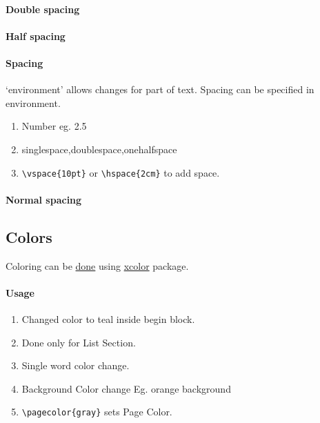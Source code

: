 \documentclass{report}[a4paper,12pt] %
\begin{document}
\paragraph{Double spacing}
\doublespacing
\lipsum[1]

\paragraph{Half spacing}
\onehalfspacing
\lipsum[1]

\begin{spacing}{2.5}
\paragraph{Spacing} `environment' allows changes for part of text.
Spacing can be specified in environment.
\begin{enumerate}
  \item Number eg. 2.5
  \item singlespace,doublespace,onehalfspace
  \item \verb|\vspace{10pt}| or \verb|\hspace{2cm}| to add space.
\end{enumerate}

\lipsum[1]
\end{spacing}

\paragraph{Normal spacing}
\lipsum[1]

\subsection{Colors}
Coloring can be \href{https://www.overleaf.com/learn/latex/Using_colours_in_LaTeX}{done} using \href{https://mirrors.sjtug.sjtu.edu.cn/ctan/macros/latex/contrib/xcolor/xcolor.pdf}{xcolor} package.

\paragraph{Usage}
\begin{enumerate}
  \color{teal}
  \item Changed color to teal inside begin block.
  \item Done only for List Section.
  \item Single \textcolor{Sepia}{word} color change.
  \item Background Color change Eg. \colorbox{BurntOrange}{orange background}
  \item \verb|\pagecolor{gray}| sets Page Color.
\end{enumerate}
\end{document}

